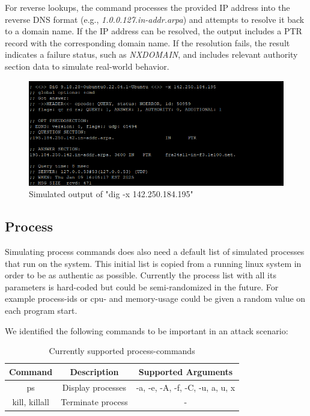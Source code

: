 For reverse lookups, the command processes the provided IP address into the reverse DNS format (e.g., \textit{1.0.0.127.in-addr.arpa}) and attempts to resolve it back to a domain name. If the IP address can be resolved, the output includes a PTR record with the corresponding domain name. If the resolution fails, the result indicates a failure status, such as \textit{NXDOMAIN}, and includes relevant authority section data to simulate real-world behavior.

\begin{figure}[H]
    \centering
    \includegraphics[width=1\linewidth]{bilder/rev-dns.png}
    \caption{Simulated output of "dig -x 142.250.184.195"}
\end{figure}


\subsection{Process}
Simulating process commands does also need a default list of simulated processes that run on the system. This initial list is copied from a running linux system in order to be as authentic as possible. Currently the process list with all its parameters is hard-coded but could be semi-randomized in the future. For example process-ids or cpu- and memory-usage could be given a random value on each program start. 

We identified the following commands to be important in an attack scenario: 

\begin{table}[H]
    \centering
    \begin{tabular}{c|c|c}
        Command & Description & Supported Arguments\\
        \hline 
        ps & Display processes & -a, -e, -A, -f, -C, -u, a, u, x \\
        kill, killall  & Terminate process & - \\
    \end{tabular}
    \caption{Currently supported process-commands}
    \label{tab:my_label}
\end{table}


